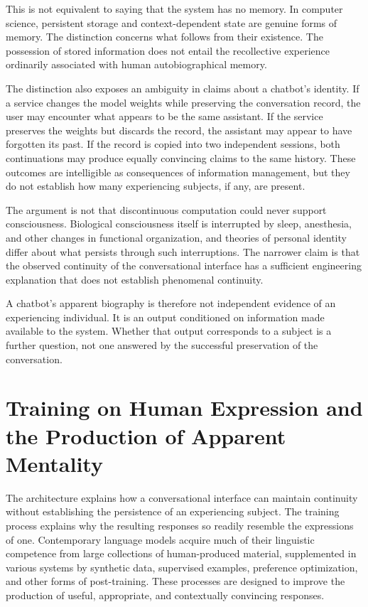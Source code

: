 \documentclass[12pt]{article}
\theoremstyle{definition}
\begin{document}
This is not equivalent to saying that the system has no memory. In computer science, persistent storage and context-dependent state are genuine forms of memory. The distinction concerns what follows from their existence. The possession of stored information does not entail the recollective experience ordinarily associated with human autobiographical memory.

The distinction also exposes an ambiguity in claims about a chatbot's identity. If a service changes the model weights while preserving the conversation record, the user may encounter what appears to be the same assistant. If the service preserves the weights but discards the record, the assistant may appear to have forgotten its past. If the record is copied into two independent sessions, both continuations may produce equally convincing claims to the same history. These outcomes are intelligible as consequences of information management, but they do not establish how many experiencing subjects, if any, are present.

The argument is not that discontinuous computation could never support consciousness. Biological consciousness itself is interrupted by sleep, anesthesia, and other changes in functional organization, and theories of personal identity differ about what persists through such interruptions. The narrower claim is that the observed continuity of the conversational interface has a sufficient engineering explanation that does not establish phenomenal continuity.

A chatbot's apparent biography is therefore not independent evidence of an experiencing individual. It is an output conditioned on information made available to the system. Whether that output corresponds to a subject is a further question, not one answered by the successful preservation of the conversation.

\section{Training on Human Expression and the Production of Apparent Mentality}
\label{sec:training}

The architecture explains how a conversational interface can maintain continuity without establishing the persistence of an experiencing subject. The training process explains why the resulting responses so readily resemble the expressions of one. Contemporary language models acquire much of their linguistic competence from large collections of human-produced material, supplemented in various systems by synthetic data, supervised examples, preference optimization, and other forms of post-training. These processes are designed to improve the production of useful, appropriate, and contextually convincing responses.
\end{document}
